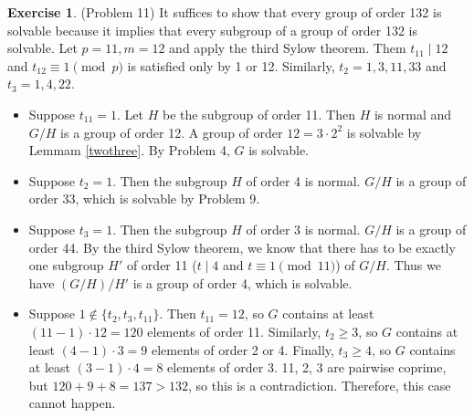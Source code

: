 \documentclass[12pt, psamsfonts]{amsart}
\theoremstyle{definition}
\newtheorem*{exer}{Exercise}
\theoremstyle{remark}
\numberwithin{equation}{section}
\begin{document}
\begin{exer}{(Problem 11)}
  It suffices to show that every group of order 132 is solvable because it implies that every subgroup of a group of order 132 is solvable.
  Let $p = 11, m = 12$ and apply the third Sylow theorem.
  Them $t_{11} \mid 12$ and $t_{12} \equiv 1 \pmod p$ is satisfied only by 1 or 12.
  Similarly, $t_2 = 1, 3, 11, 33$ and $t_3 = 1, 4, 22$.
  \begin{itemize}
    \item
      Suppose $t_{11} = 1$.
      Let $H$ be the subgroup of order 11.
      Then $H$ is normal and $G / H$ is a group of order 12.
      A group of order $12 = 3 \cdot 2^2$ is solvable by Lemmam \ref{twothree}.
      By Problem 4, $G$ is solvable.
    \item
      Suppose $t_2 = 1$.
      Then the subgroup $H$ of order 4 is normal.
      $G / H$ is a group of order 33, which is solvable by Problem 9.
    \item
      Suppose $t_3 = 1$.
      Then the subgroup $H$ of order 3 is normal.
      $G / H$ is a group of order 44.
      By the third Sylow theorem, we know that there has to be exactly one subgroup $H'$ of order 11 ($t \mid 4$ and $t \equiv 1 \pmod{11}$) of $G / H$.
      Thus we have $(G / H) / H'$ is a group of order 4, which is solvable.
    \item
      Suppose $1 \notin \{ t_2, t_3, t_{11} \}$.
      Then $t_{11} = 12$, so $G$ contains at least $(11 - 1) \cdot 12 = 120$ elements of order 11.
      Similarly, $t_2 \geq 3$, so $G$ contains at least $(4 - 1) \cdot 3 = 9$ elements of order 2 or 4.
      Finally, $t_3 \geq 4$, so $G$ contains at least $(3 - 1) \cdot 4 = 8$ elements of order 3.
      11, 2, 3 are pairwise coprime, but $120 + 9 + 8 = 137 > 132$, so this is a contradiction.
      Therefore, this case cannot happen.
  \end{itemize}
\end{exer}
\end{document}
